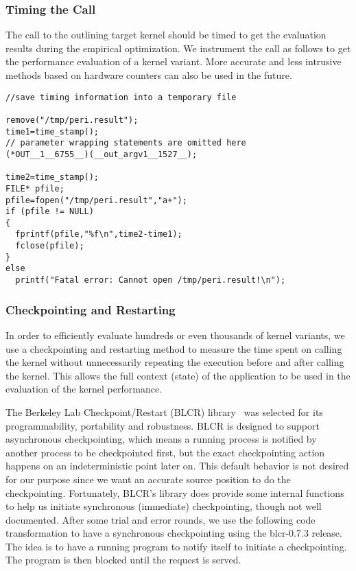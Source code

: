 \subsubsection{Timing the Call}
The call to the outlining target kernel should be timed to get the
evaluation results during the empirical optimization. 
We instrument the call as follows to get the performance evaluation of a
kernel variant. 
More accurate and less intrusive methods based on hardware
counters can also be used in the future. 

{\mySmallFontSize
\begin{verbatim}
//save timing information into a temporary file

remove("/tmp/peri.result");
time1=time_stamp();
// parameter wrapping statements are omitted here
(*OUT__1__6755__)(__out_argv1__1527__);

time2=time_stamp();
FILE* pfile;
pfile=fopen("/tmp/peri.result","a+");
if (pfile != NULL)
{
  fprintf(pfile,"%f\n",time2-time1);
  fclose(pfile);
}
else
  printf("Fatal error: Cannot open /tmp/peri.result!\n");

\end{verbatim}
}

\subsubsection{Checkpointing and Restarting}
In order to efficiently evaluate hundreds or even thousands of kernel
variants, we use a checkpointing and restarting method to measure the time
spent on calling the kernel without unnecessarily repeating the execution
before and after calling the kernel.  This allows the full context (state) 
of the application to be used in the evaluation of the kernel performance.

The Berkeley Lab Checkpoint/Restart (BLCR) library~\cite{blcrWeb} was selected for its
programmability, portability and robustness. 
BLCR is designed to support asynchronous checkpointing, which means a running process
is notified by another process to be checkpointed first, but the exact checkpointing
action happens on an indeterministic point later on. 
This default behavior is not desired for our purpose since we want an
accurate source position to do the checkpointing. 
Fortunately, BLCR's library does provide some internal functions to help
us initiate synchronous (immediate) checkpointing, though not well documented. 
After some trial and error rounds, we use the following code transformation
to have a synchronous checkpointing using the blcr-0.7.3 release.
The idea is to have a running program to notify itself to initiate a checkpointing. 
The program is then blocked until the request is served. 


